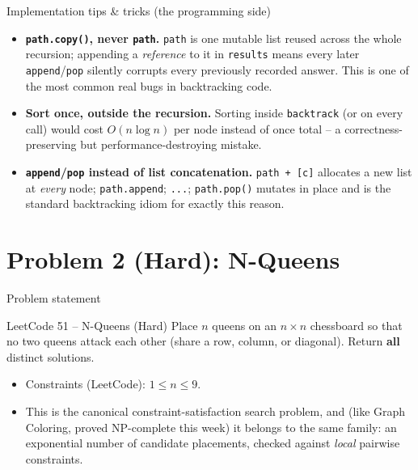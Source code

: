 \documentclass[11pt,aspectratio=169]{beamer}
\begin{document}
\begin{frame}{Implementation tips \& tricks (the programming side)}
  \small
  \begin{itemize}
    \item \textbf{\texttt{path.copy()}, never \texttt{path}.} \texttt{path} is one
    mutable list reused across the whole recursion; appending a \emph{reference} to it
    in \texttt{results} means every later \texttt{append}/\texttt{pop} silently
    corrupts every previously recorded answer. This is one of the most common real bugs
    in backtracking code.
    \item \textbf{Sort once, outside the recursion.} Sorting inside \texttt{backtrack}
    (or on every call) would cost $O(n \log n)$ per node instead of once total --
    a correctness-preserving but performance-destroying mistake.
    \item \textbf{\texttt{append}/\texttt{pop} instead of list concatenation.}
    \texttt{path + [c]} allocates a new list at \emph{every} node; \texttt{path.append};
    \texttt{...}; \texttt{path.pop()} mutates in place and is the standard backtracking
    idiom for exactly this reason.
  \end{itemize}
\end{frame}

\section{Problem 2 (Hard): N-Queens}

\begin{frame}{Problem statement}
  \begin{block}{LeetCode 51 -- N-Queens (\textcolor{red!60!black}{Hard})}
    Place $n$ queens on an $n \times n$ chessboard so that no two queens attack each
    other (share a row, column, or diagonal). Return \textbf{all} distinct solutions.
  \end{block}
  \begin{itemize}
    \item Constraints (LeetCode): $1 \le n \le 9$.
    \item This is the canonical constraint-satisfaction search problem, and (like
    Graph Coloring, proved NP-complete this week) it belongs to the same family: an
    exponential number of candidate placements, checked against \emph{local}
    pairwise constraints.
  \end{itemize}
\end{frame}
\end{document}
